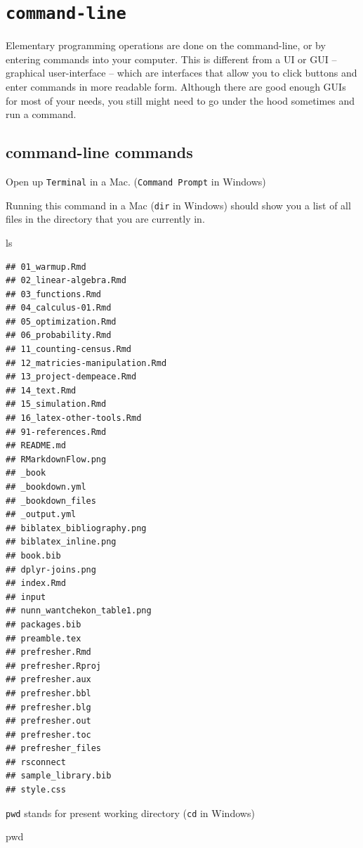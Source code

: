 \documentclass[]{book}
\newenvironment{Shaded}{\begin{snugshade}}{\end{snugshade}}
\newcommand{\FunctionTok}[1]{\textcolor[rgb]{0.00,0.00,0.00}{#1}}
\newcommand{\BuiltInTok}[1]{#1}
\theoremstyle{definition}
\theoremstyle{definition}
\theoremstyle{definition}
\theoremstyle{remark}
\begin{document}
\section{\texorpdfstring{\texttt{command-line}}{command-line}}\label{command-line}

Elementary programming operations are done on the command-line, or by
entering commands into your computer. This is different from a UI or GUI
-- graphical user-interface -- which are interfaces that allow you to
click buttons and enter commands in more readable form. Although there
are good enough GUIs for most of your needs, you still might need to go
under the hood sometimes and run a command.

\subsection{command-line commands}\label{command-line-commands}

Open up \texttt{Terminal} in a Mac. (\texttt{Command\ Prompt} in
Windows)

Running this command in a Mac (\texttt{dir} in Windows) should show you
a list of all files in the directory that you are currently in.

\begin{Shaded}
\begin{Highlighting}[]
\FunctionTok{ls}
\end{Highlighting}
\end{Shaded}

\begin{verbatim}
## 01_warmup.Rmd
## 02_linear-algebra.Rmd
## 03_functions.Rmd
## 04_calculus-01.Rmd
## 05_optimization.Rmd
## 06_probability.Rmd
## 11_counting-census.Rmd
## 12_matricies-manipulation.Rmd
## 13_project-dempeace.Rmd
## 14_text.Rmd
## 15_simulation.Rmd
## 16_latex-other-tools.Rmd
## 91-references.Rmd
## README.md
## RMarkdownFlow.png
## _book
## _bookdown.yml
## _bookdown_files
## _output.yml
## biblatex_bibliography.png
## biblatex_inline.png
## book.bib
## dplyr-joins.png
## index.Rmd
## input
## nunn_wantchekon_table1.png
## packages.bib
## preamble.tex
## prefresher.Rmd
## prefresher.Rproj
## prefresher.aux
## prefresher.bbl
## prefresher.blg
## prefresher.out
## prefresher.toc
## prefresher_files
## rsconnect
## sample_library.bib
## style.css
\end{verbatim}

\texttt{pwd} stands for present working directory (\texttt{cd} in
Windows)

\begin{Shaded}
\begin{Highlighting}[]
\BuiltInTok{pwd}
\end{Highlighting}
\end{Shaded}
\end{document}
